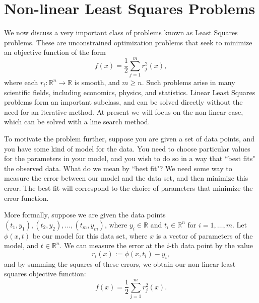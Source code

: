 \section*{Non-linear Least Squares Problems}
We now discuss a very important class of problems known as Least Squares problems. These
are unconstrained optimization problems that seek to minimize an objective function of the form
$$
f(x) = \frac{1}{2}\displaystyle\sum_{j=1}^m r_j^2(x),
$$
where each $r_i : \mathbb{R}^n \rightarrow \mathbb{R}$ is smooth, and $m \geq n$. Such problems
arise in many scientific fields, including economics, physics, and statistics. Linear Least
Squares problems form an important subclass, and can be solved directly without the need for an
iterative method. At present we will focus on the non-linear case, which can be solved with a
line search method.

To motivate the problem further, suppose you are given a set of data points, and you have some kind of model for the data.
You need to choose particular values for the parameters in your model, and you wish to do so in a way that ``best fits"
the observed data. What do we mean by ``best fit"? We need some way to measure the error between our model and the data set,
and then minimize this error. The best fit will correspond to the choice of parameters that minimize the error function.

More formally, suppose we are given the data points $(t_1, y_1), (t_2, y_2), \ldots, (t_m, y_m)$, where $y_i \in \mathbb{R}$
and $t_i \in \mathbb{R}^n$ for $i = 1, \ldots, m$. Let $\phi(x, t)$ be our model for this data set, where $x$ is
a vector of parameters of the model, and $t \in \mathbb{R}^n$. We can measure the error at the $i$-th data point by the value
$$r_i(x) := \phi(x, t_i) - y_i,$$ and by summing the squares of these errors, we obtain our non-linear least squares objective
function:
$$
f(x) = \frac{1}{2} \displaystyle \sum_{j=1}^m  r_j^2(x).
$$

